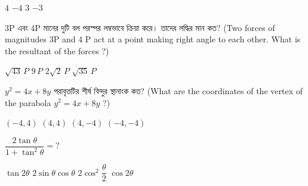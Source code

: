 \documentclass[addpoints]{exam}
\begin{document}
\begin{questions}
\begin{oneparchoices}
\choice $ 4 $
\choice $ -4 $
\choice $ 3 $
\choice $ -3 $
\end{oneparchoices}

\question 3P এবং 4P মানের দুটি বল পরস্পর লম্বভাবে ক্রিয়া করে। তাদের লদ্ধির মান কত? (Two forces of magnitudes 3P and 4 P act at a point making right angle to each other. What is the resultant of the forces ?)


\begin{oneparchoices}
 \choice $ \sqrt{43}\,P $
 \choice $ 9\,P $
 \choice $ 2\sqrt{2}\,P $
 \choice $ \sqrt{35}\,P $
\end{oneparchoices}

\question  $ y^{2} = 4x+8y $ পরাবৃত্তটির শীর্ষ বিন্দুর স্থানাংক কত? (What are the coordinates of the vertex of the parabola $ y^{2} = 4x+8y $ ?)

\begin{oneparchoices}
\choice $ (-4,4) $
\choice $ (4,4) $
\choice $ (4,-4) $
\choice $ (-4,-4) $
\end{oneparchoices}

\question $ \dfrac{2\tan\theta}{1+\tan^{2}\theta} =? $

\begin{oneparchoices}
\choice $ \tan 2\theta $
\choice $ 2\sin \theta\cos \theta $
\choice $ 2\cos^{2}\dfrac{\theta}{2} $
\choice $ \cos 2\theta $
\end{oneparchoices}

\end{questions}
\end{document}
